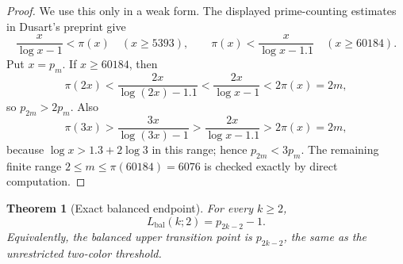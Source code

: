\documentclass[11pt]{article}
\theoremstyle{plain}
\newtheorem{theorem}{Theorem}[section]
\theoremstyle{definition}
\theoremstyle{remark}
\begin{document}
\begin{proof}
We use this only in a weak form.  The displayed prime-counting estimates in
Dusart's preprint \cite[Theorem~6.9]{dusart2010} give
\[
  \frac{x}{\log x-1}<\pi(x)\quad (x\ge5393),
  \qquad
  \pi(x)<\frac{x}{\log x-1.1}\quad (x\ge60184).
\]
Put $x=p_m$.  If $x\ge60184$, then
\[
  \pi(2x)<\frac{2x}{\log(2x)-1.1}
  <\frac{2x}{\log x-1}<2\pi(x)=2m,
\]
so $p_{2m}>2p_m$.  Also
\[
  \pi(3x)>\frac{3x}{\log(3x)-1}
  >\frac{2x}{\log x-1.1}>2\pi(x)=2m,
\]
because $\log x>1.3+2\log 3$ in this range; hence $p_{2m}<3p_m$.
The remaining finite range $2\le m\le \pi(60184)=6076$ is checked exactly by
direct computation.
\end{proof}

\begin{theorem}[Exact balanced endpoint]
\label{thm:balanced-exact}
For every $k\ge2$,
\[
  L_{\mathrm{bal}}(k;2)=p_{2k-2}-1.
\]
Equivalently, the balanced upper transition point is $p_{2k-2}$, the same as
the unrestricted two-color threshold.
\end{theorem}
\end{document}
